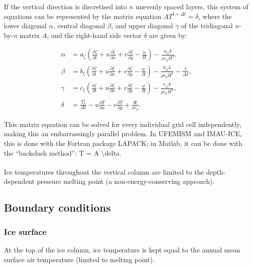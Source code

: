 \documentclass{article}
\begin{document}
If the vertical direction is discretised into $n$ unevenly spaced layers, this system of equations can be represented by the matrix equation $A T^{t+\Delta t} = \delta$, where the lower diagonal $\alpha$, central diagonal $\beta$, and upper diagonal $\gamma$ of the tridiagonal $n$-by-$n$ matrix $A$, and the right-hand side vector $\delta$ are given by:

\begin{align}
\alpha &= a_{\zeta} \left( \frac{\partial \zeta}{\partial t} + u \frac{\partial \zeta}{\partial x} + v \frac{\partial \zeta}{\partial y} - \frac{w}{H} \right) - \frac{a_{\zeta \zeta} k}{\rho c_p H^2}, \\
\beta &= b_{\zeta} \left( \frac{\partial \zeta}{\partial t} + u \frac{\partial \zeta}{\partial x} + v \frac{\partial \zeta}{\partial y} - \frac{w}{H} \right) - \frac{b_{\zeta \zeta} k}{\rho c_p H^2} - \frac{1}{\Delta t}, \\
\gamma &= c_{\zeta} \left( \frac{\partial \zeta}{\partial t} + u \frac{\partial \zeta}{\partial x} + v \frac{\partial \zeta}{\partial y} - \frac{w}{H} \right) - \frac{c_{\zeta \zeta} k}{\rho c_p H^2}, \\
\delta &= \frac{T_k^t}{\Delta t} - u \frac{\partial T}{\partial x} - v \frac{\partial T}{\partial y} + \frac{\Phi}{\rho c_p}.
\end{align}

This matrix equation can be solved for every individual grid cell independently, making this an embarrassingly parallel problem. In UFEMISM and IMAU-ICE, this is done with the Fortran package LAPACK; in Matlab, it can be done with the “backslash method”: T = A \textbackslash delta.\\
\\
Ice temperatures throughout the vertical column are limited to the depth-dependent pressure melting point (a non-energy-conserving approach).

\subsection{Boundary conditions}

\subsubsection{Ice surface}

At the top of the ice column, ice temperature is kept equal to the annual mean surface air temperature (limited to melting point).
\end{document}
